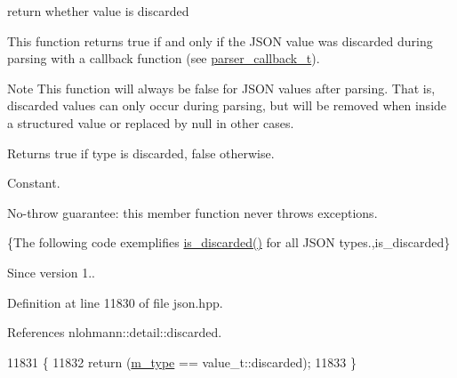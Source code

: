 return whether value is discarded 

This function returns true if and only if the J\+S\+ON value was discarded during parsing with a callback function (see \hyperlink{classnlohmann_1_1basic__json_ab4f78c5f9fd25172eeec84482e03f5b7}{parser\+\_\+callback\+\_\+t}).

\begin{DoxyNote}{Note}
This function will always be {\ttfamily false} for J\+S\+ON values after parsing. That is, discarded values can only occur during parsing, but will be removed when inside a structured value or replaced by null in other cases.
\end{DoxyNote}
\begin{DoxyReturn}{Returns}
{\ttfamily true} if type is discarded, {\ttfamily false} otherwise.
\end{DoxyReturn}
Constant.

No-\/throw guarantee\+: this member function never throws exceptions.

\{The following code exemplifies {\ttfamily \hyperlink{classnlohmann_1_1basic__json_aabe623bc8304c2ba92d96d91f390fab4}{is\+\_\+discarded()}} for all J\+S\+ON types.,is\+\_\+discarded\}

\begin{DoxySince}{Since}
version 1.. 
\end{DoxySince}


Definition at line 11830 of file json.\+hpp.



References nlohmann\+::detail\+::discarded.


\begin{DoxyCode}
11831     \{
11832         \textcolor{keywordflow}{return} (\hyperlink{classnlohmann_1_1basic__json_a91990b60d7d4d67968a2c1db677536e7}{m\_type} == value\_t::discarded);
11833     \}
\end{DoxyCode}
\mbox{\label{classnlohmann_1_1basic__json_a8faa039ca82427ed29c486ffd00600c3}} 
